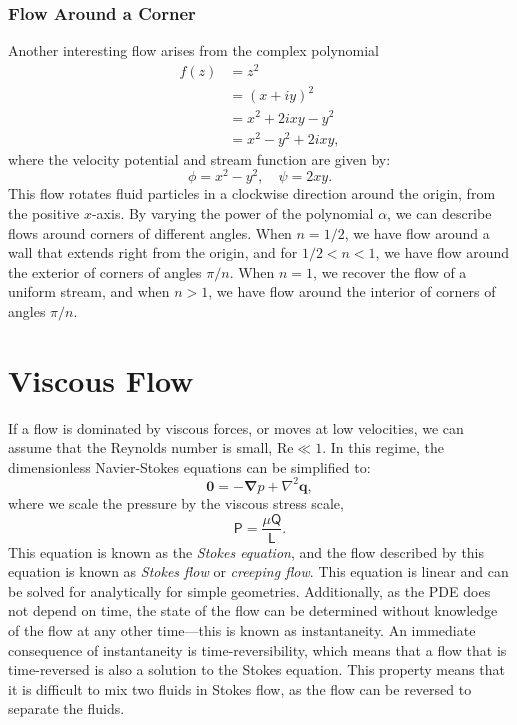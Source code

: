\documentclass{article}
\theoremstyle{definition}
\begin{document}
\subsubsection{Flow Around a Corner}
Another interesting flow arises from the complex polynomial
\begin{align*}
    f\left( z \right) & = z^2                      \\
                      & = \left( x + i y \right)^2 \\
                      & = x^2 + 2 i x y - y^2      \\
                      & = x^2 - y^2 + 2 i x y,
\end{align*}
where the velocity potential and stream function are given by:
\begin{equation*}
    \phi = x^2 - y^2, \quad \psi = 2xy.
\end{equation*}
This flow rotates fluid particles in a clockwise direction around the
origin, from the positive \(x\)-axis. By varying the power of the
polynomial \(\alpha\), we can describe flows around corners of different
angles. When \(n = 1/2\), we have flow around a wall that extends right
from the origin, and for \(1/2 < n < 1\), we have flow around the
exterior of corners of angles \(\pi/n\). When \(n = 1\), we recover the
flow of a uniform stream, and when \(n > 1\), we have flow around the
interior of corners of angles \(\pi/n\).
\section{Viscous Flow}
If a flow is dominated by viscous forces, or moves at low velocities,
we can assume that the Reynolds number is small, \(\mathrm{Re} \ll 1\).
In this regime, the dimensionless Navier-Stokes equations can be
simplified to:
\begin{equation*}
    \symbf{0} = -\symbf{\nabla} p + \nabla^2 \symbf{q},
\end{equation*}
where we scale the pressure by the viscous stress scale,
\begin{equation*}
    \mathsf{P} = \frac{\mu \mathsf{Q}}{\mathsf{L}}.
\end{equation*}
This equation is known as the \textit{Stokes equation}, and the flow
described by this equation is known as \textit{Stokes flow} or
\textit{creeping flow}. This equation is linear and can be solved for
analytically for simple geometries. Additionally, as the PDE does not
depend on time, the state of the flow can be determined without
knowledge of the flow at any other time---this is known as instantaneity.
An immediate consequence of instantaneity is time-reversibility, which
means that a flow that is time-reversed is also a solution to the
Stokes equation. This property means that it is difficult to mix two
fluids in Stokes flow, as the flow can be reversed to separate the
fluids.
\end{document}
